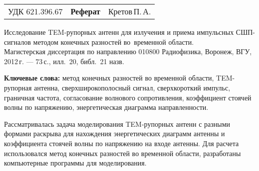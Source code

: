 
\noindent
{
\begin{tabularx}{\textwidth}{lCr}
УДК 621.396.67 & \textbf{Реферат} & Кретов\,П.\,А.
\end{tabularx}}
\vspace{10mm}

\noindent
Исследование TEM-рупорных антенн для излучения и приема импульсных СШП-сигналов
методом конечных разностей во~временной области.\\
Магистерская диссертация по направлению 010800 Радиофизика, Воронеж, ВГУ, 2012\,г.
--- 73\,с., илл.~20, библ.~21 назв.

\vspace{10mm}

\noindent
\textbf{Ключевые слова:}
    метод конечных разностей во временной области,
    TEM-рупорная антенна,
    сверхширокополосный сигнал,
    сверхкороткий импульс,
    граничная частота,
    согласование волнового сопротивления,
    коэффициент стоячей волны по напряжению,
    энергетическая диаграмма направленности.

\vspace{10mm}
\noindent
Рассматривалась задача моделирования TEM-рупорных антенн с разными формами
раскрыва для нахождения энергетических диаграмм антенны и коэффициента стоячей
волны по напряжению на входе антенны. Для расчета использовался метод конечных
разностей во временной области, разработаны компьютерные программы для
моделирования.
\clearpage
